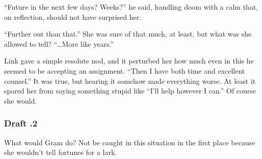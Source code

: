 \documentclass[../FGP.tex]{subfiles}
\begin{document}
\begin{fragment}
``Future in the next few days? Weeks?'' he said, handling doom with a calm that, on reflection, should not have surprised her.

``Further out than that.'' She was sure of that much, at least, but what was she allowed to tell? ``\ldots More like years.''

Link gave a simple resolute nod, and it perturbed her how much even in this he seemed to be accepting an assignment. 
``Then I have both time and excellent counsel.'' 
It was true, but hearing it somehow made everything worse. At least it spared her from saying something stupid like ``I'll help however I can.'' Of course she would.\reversemarginpar{}

\subsubsection{Draft \thefragment.2}
What would Gram do? Not be caught in this situation in the first place because she wouldn't tell fortunes for a lark. 
\end{fragment}
\end{document}
